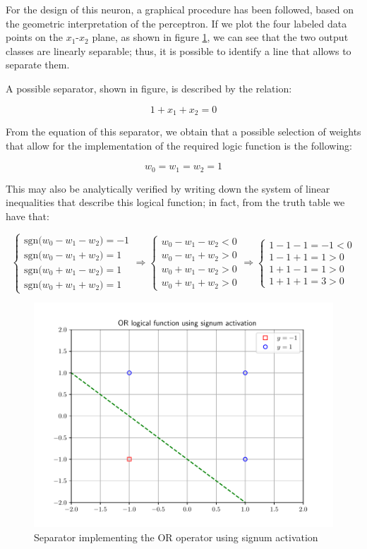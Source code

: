 \documentclass[letterpaper,headings=standardclasses]{scrartcl}
\begin{document}
For the design of this neuron, a graphical procedure has been followed, based on the geometric interpretation of the perceptron. If we plot the four labeled data points on the $x_1$-$x_2$ plane, as shown in figure \ref{or_func}, we can see that the two output classes are linearly separable; thus, it is possible to identify a line that allows to separate them.

A possible separator, shown in figure, is described by the relation:

$$ 1 + x_1 + x_2 = 0 $$

From the equation of this separator, we obtain that a possible selection of weights that allow for the implementation of the required logic function is the following:

$$ w_0 = w_1 = w_2 = 1 $$

This may also be analytically verified by writing down the system of linear inequalities that describe this logical function; in fact, from the truth table we have that:

$$ \begin{cases} \text{sgn(} w_0 - w_1 - w_2 \text{)} = -1 \\ \text{sgn(} w_0 - w_1 + w_2 \text{)} = 1 \\ \text{sgn(} w_0 + w_1 - w_2 \text{)} = 1 \\ \text{sgn(} w_0 + w_1 + w_2 \text{)} = 1 \end{cases} \Rightarrow \begin{cases} w_0 - w_1 - w_2 < 0 \\ w_0 - w_1 + w_2 > 0 \\ w_0 + w_1 - w_2 > 0 \\ w_0 + w_1 + w_2 > 0 \end{cases} \Rightarrow \begin{cases} 1 - 1 - 1 = -1 < 0 \\ 1 - 1 + 1 = 1 > 0 \\ 1 + 1 - 1 = 1 > 0 \\ 1 + 1 + 1 = 3 > 0 \end{cases} $$

\begin{figure}[h]
\centering
\includegraphics[width=.7\linewidth]{or_func.pdf}
\caption{Separator implementing the OR operator using signum activation}
\label{or_func}
\end{figure}
\end{document}
